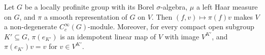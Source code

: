 Let $G$ be a locally profinite group with its Borel $\sigma$-algebra, $\mu$ a left Haar measure on $G$, and $\pi$ a
smooth representation of $G$ on $V$. Then $(f,v)\mapsto\pi(f)v$ makes $V$ a non-degenerate $C_c^\infty(G)$-module.
Moreover, for every compact open subgroup $K'\subseteq G$, $\pi(e_{K'})$ is an idempotent linear map of $V$ with image
$V^{K'}$, and $\pi(e_{K'})v=v$ for $v\in V^{K'}$.
